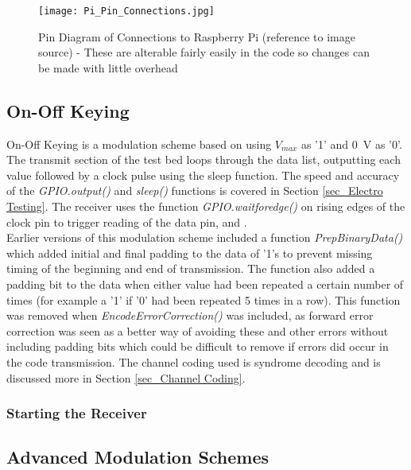\documentclass[../main.tex]{subfiles}
\begin{document}
\begin{figure}[ht]
	\centering
	\texttt{[image: Pi\_Pin\_Connections.jpg]}
	\caption{Pin Diagram of Connections to Raspberry Pi (reference to image source) - These are alterable fairly easily in the code so changes can be made with little overhead}
	\label{fig_Pin Connections}
\end{figure}

\subsection{On-Off Keying} \label{sec_On-Off Keying}

On-Off Keying is a modulation scheme based on using $V_{max}$ as '1' and \SI{0}{\volt} as '0'.
The transmit section of the test bed loops through the data list, outputting each value followed by a clock pulse using the sleep function.
The speed and accuracy of the \textit{GPIO.output()} and \textit{sleep()} functions is covered in Section \ref{sec_Electro Testing}.
The receiver uses the function \textit{GPIO.wait\textunderscore for\textunderscore edge()} on rising edges of the clock pin to trigger reading of the data pin, and .\\

Earlier versions of this modulation scheme included a function \textit{Prep\textunderscore Binary\textunderscore Data()} which added initial and final padding to the data of '1's to prevent missing timing of the beginning and end of transmission.
The function also added a padding bit to the data when either value had been repeated a certain number of times (for example a '1' if '0' had been repeated 5 times in a row).
This function was removed when \textit{Encode\textunderscore Error\textunderscore Correction()} was included, as forward error correction was seen as a better way of avoiding these and other errors without including padding bits which could be difficult to remove if errors did occur in the code transmission.
The channel coding used is syndrome decoding and is discussed more in Section \ref{sec_Channel Coding}.\\


\subsubsection{Starting the Receiver}

\subsection{Advanced Modulation Schemes} \label{sec_Advanced Modulation Schemes}
\end{document}
